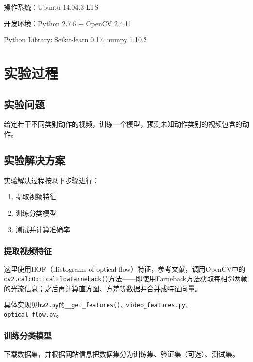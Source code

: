 \documentclass[a4paper, 12pt, UTF8]{article}
\begin{document}
操作系统：Ubuntu 14.04.3 LTS

开发环境：Python 2.7.6 + OpenCV 2.4.11

Python Library: Scikit-learn 0.17, numpy 1.10.2


\section{实验过程}

\subsection{实验问题}

给定若干不同类别动作的视频，训练一个模型，预测未知动作类别的视频包含的动作。


\subsection{实验解决方案}

实验解决过程按以下步骤进行：

\begin{enumerate}

\item 提取视频特征

\item 训练分类模型

\item 测试并计算准确率

\end{enumerate}

\subsubsection{提取视频特征}

这里使用HOF（Histograms of optical flow）特征，参考文献\cite{ref1}，调用OpenCV中的\lstinline[language=Python]{cv2.calcOpticalFlowFarneback()}方法\textsuperscript{\cite{ref2}}——即使用Farneback方法获取每相邻两帧的光流信息；之后再计算直方图、方差等数据并合并成特征向量。

具体实现见\lstinline{hw2.py的__get_features()、video_features.py、optical_flow.py}。

\subsubsection{训练分类模型}

下载数据集，并根据网站信息把数据集分为训练集、验证集（可选）、测试集。
\end{document}
